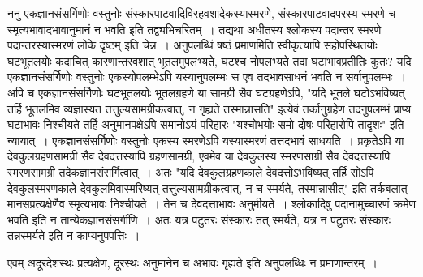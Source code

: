 {ननु एकज्ञानसंसर्गिणोः वस्तुनोः संस्कारपाटवादिविरहवशादेकस्यास्मरणे, संस्कारपाटवादपरस्य स्मरणे च स्मृत्यभावादभावानुमानं न भवति इति तद्व्यभिचरितम्~। तद्यथा अधीतस्य श्लोकस्य पदान्तर स्मरणे पदान्तरस्यास्मरणं लोके दृष्टम् इति चेन्न~। अनुपलब्धिं षष्ठं प्रमाणमिति स्वीकृत्यापि सहोपस्थितयोः घटभूतलयोः कदाचित् कारणान्तरवशात् भूतलमुपलभ्यते, घटश्च नोपलभ्यते तदा घटाभावप्रतीतिः कुतः? यदि एकज्ञानसंसर्गिणोः वस्तुनोः एकस्योपलम्भेऽपि यस्यानुपलम्भः स एव तदभावसाधनं भवति न सर्वानुपलम्भः~। अपि च एकज्ञानसंसर्गिणोः घटभूतलयोः भूतलग्रहणे या सामग्री सैव घटग्रहणेऽपि, "यदि भूतले घटोऽभविष्यत् तर्हि भूतलमिव व्यज्ञास्यत तत्तुल्यसामग्रीकत्वात्, न गृह्यते तस्मान्नासति" इत्येवं तर्कानुग्रहेण तदनुपलम्भं प्राप्य घटाभावः निश्चीयते तर्हि अनुमानपक्षेऽपि समानोऽयं परिहारः "यश्चोभयोः समो दोषः परिहारोपि तादृशः" इति न्यायात्~। एकज्ञानसंसर्गिणोः वस्तुनोः एकस्य स्मरणेऽपि यस्यास्मरणं तत्तदभावं साधयति~। प्रकृतेऽपि या देवकुलग्रहणसामग्री सैव देवदत्तस्यापि ग्रहणसामग्री, एवमेव या देवकुलस्य स्मरणसाग्री सैव देवदत्तस्यापि स्मरणसामग्री तदेकज्ञानसंसर्गित्वात्~। अतः "यदि देवकुलग्रहणकाले देवदत्तोऽभविष्यत् तर्हि सोऽपि देवकुलस्मरणकाले देवकुलमिवास्मरिष्यत् तत्तुल्यसामग्रीकत्वात्, न च स्मर्यते, तस्मान्नासीत्" इति तर्कबलात् मानसप्रत्यक्षेणैव स्मृत्यभावः निश्चीयते~। तेन च देवदत्ताभावः अनुमीयते~। श्लोकादिषु पदानामुच्चारणं क्रमेण भवति इति न तान्येकज्ञानसंसर्गीणि~। अतः यत्र पटुतरः संस्कारः तत् स्मर्यते, यत्र न पटुतरः संस्कारः तन्नस्मर्यते इति न काप्यनुपपत्तिः~। 

एवम् अदूरदेशस्थः प्रत्यक्षेण, दूरस्थः अनुमानेन च अभावः गृह्यते इति अनुपलब्धिः न प्रमाणान्तरम्~। 

\articleend
}
